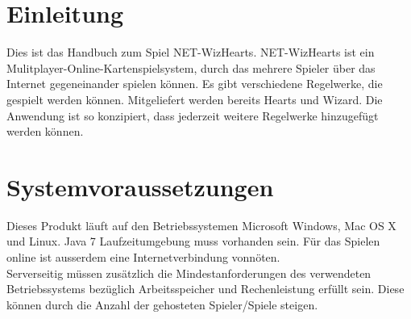 \documentclass[titlepage,10pt,a4paper]{article}
\begin{document}
\newpage
 
\section{Einleitung}
Dies ist das Handbuch zum Spiel NET-WizHearts. NET-WizHearts ist ein Mulitplayer-Online-Kartenspielsystem, durch das mehrere Spieler über das Internet gegeneinander spielen können. Es gibt verschiedene Regelwerke, die gespielt werden können. Mitgeliefert werden bereits Hearts und Wizard. Die Anwendung ist so konzipiert, dass jederzeit weitere \gls{Regelwerk}e hinzugefügt werden können.

\section{Systemvoraussetzungen}
Dieses Produkt läuft auf den Betriebssystemen Microsoft Windows, Mac OS X und Linux. Java 7 Laufzeitumgebung muss vorhanden sein. Für das Spielen online ist ausserdem eine Internetverbindung vonnöten. \\
\gls{Server}seitig müssen zusätzlich die Mindestanforderungen des verwendeten Betriebssystems bezüglich Arbeitsspeicher und Rechenleistung erfüllt sein. Diese können durch die Anzahl der gehosteten Spieler/Spiele steigen.
\end{document}
